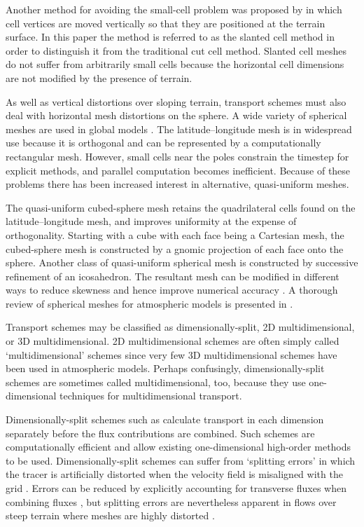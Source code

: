 Another method for avoiding the small-cell problem was proposed by \citep{shaw-weller2016} in which cell vertices are moved vertically so that they are positioned at the terrain surface.  In this paper the method is referred to as the slanted cell method in order to distinguish it from the traditional cut cell method.  Slanted cell meshes do not suffer from arbitrarily small cells because the horizontal cell dimensions are not modified by the presence of terrain.

As well as vertical distortions over sloping terrain, transport schemes must also deal with horizontal mesh distortions on the sphere.  A wide variety of spherical meshes are used in global models \citep{staniforth-thuburn2012}.  The latitude--longitude mesh is in widespread use because it is orthogonal and can be represented by a computationally rectangular mesh.  However, small cells near the poles constrain the timestep for explicit methods, and parallel computation becomes inefficient.  Because of these problems there has been increased interest in alternative, quasi-uniform meshes.

The quasi-uniform cubed-sphere mesh retains the quadrilateral cells found on the latitude--longitude mesh, and improves uniformity at the expense of orthogonality.  Starting with a cube with each face being a Cartesian mesh, the cubed-sphere mesh is constructed by a gnomic projection of each face onto the sphere.
Another class of quasi-uniform spherical mesh is constructed by successive refinement of an icosahedron.  The resultant mesh can be modified in different ways to reduce skewness and hence improve numerical accuracy \citep{heikes-randall1995b,tomita2002}.  A thorough review of spherical meshes for atmospheric models is presented in \citep{staniforth-thuburn2012}.

Transport schemes may be classified as dimensionally-split, 2D multidimensional, or 3D multidimensional.  2D multidimensional schemes are often simply called `multidimensional' schemes since very few 3D multidimensional schemes have been used in atmospheric models.
Perhaps confusingly, dimensionally-split schemes are sometimes called multidimensional, too, because they use one-dimensional techniques for multidimensional transport.

Dimensionally-split schemes such as \citep{lin-rood1996,putman-lin2007,katta2015} calculate transport in each dimension separately before the flux contributions are combined.  Such schemes are computationally efficient and allow existing one-dimensional high-order methods to be used.
  Dimensionally-split schemes can suffer from `splitting errors' in which the tracer is artificially distorted when the velocity field is misaligned with the grid \citep{leonard1993}.  Errors can be reduced by explicitly accounting for transverse fluxes when combining fluxes \citep{leonard1996}, but splitting errors are nevertheless apparent in flows over steep terrain where meshes are highly distorted \citep{weller2017}.

